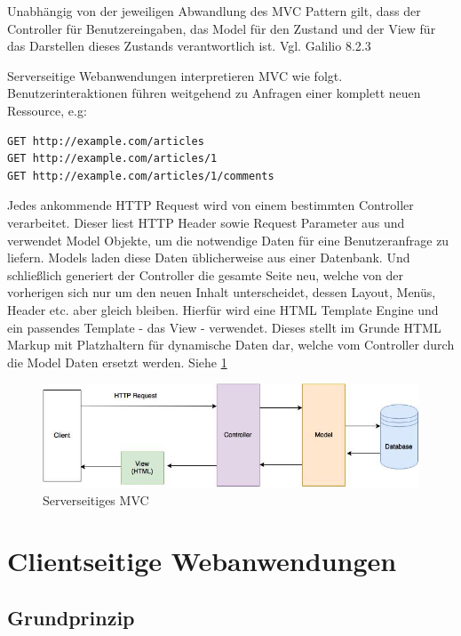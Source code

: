 Unabhängig von der jeweiligen Abwandlung des MVC Pattern gilt, dass der Controller für Benutzereingaben, das Model für den Zustand und der View für das Darstellen dieses Zustands verantwortlich ist. Vgl. Galilio  8.2.3

Serverseitige Webanwendungen interpretieren MVC wie folgt. Benutzerinteraktionen führen weitgehend zu Anfragen einer komplett neuen Ressource, e.g:

\begin{verbatim}
GET http://example.com/articles
GET http://example.com/articles/1
GET http://example.com/articles/1/comments
\end{verbatim}

Jedes ankommende HTTP Request wird von einem bestimmten Controller verarbeitet. Dieser liest HTTP Header sowie Request Parameter aus und verwendet Model Objekte, um die notwendige Daten für eine Benutzeranfrage zu liefern. Models laden diese Daten üblicherweise aus einer Datenbank. Und schließlich generiert der Controller die gesamte Seite neu, welche von der vorherigen sich nur um den neuen Inhalt unterscheidet, dessen Layout, Menüs, Header etc. aber gleich bleiben. Hierfür wird eine HTML Template Engine und ein passendes Template - das View - verwendet. Dieses stellt im Grunde HTML Markup mit Platzhaltern für dynamische Daten dar, welche vom Controller durch die Model Daten ersetzt werden. Siehe \ref{fig:server_side_mvc}
{}
\begin{figure}[htp]     %
\centering
\includegraphics[width=1.0\textwidth]{images/server_side_mvc} 
\caption{Serverseitiges MVC}\label{fig:server_side_mvc}
\end{figure}

\section{Clientseitige Webanwendungen}

\subsection{Grundprinzip}

